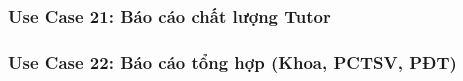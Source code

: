 
\newpage
\subsubsection*{Use Case 21: Báo cáo chất lượng Tutor}
\begin{samepage}

\end{samepage}


\newpage
\subsubsection*{Use Case 22: Báo cáo tổng hợp (Khoa, PCTSV, PĐT)}
\begin{samepage}

\end{samepage}


